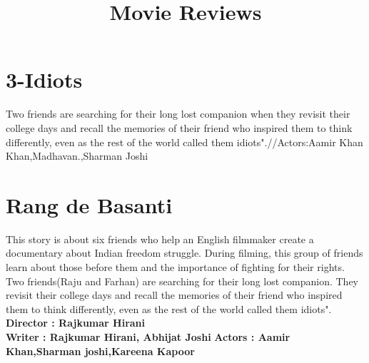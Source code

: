 \documentclass{article}
\title{Movie Reviews}
\begin{document}
	\maketitle
	\section{3-Idiots}
	\large{Two friends are searching for their long lost companion when they revisit their college days and recall the memories of their friend who inspired them to think differently, even as the rest of the world called them idiots".//Actors:Aamir Khan Khan,Madhavan.,Sharman Joshi}
	\section{Rang de Basanti}
	\large{This story is about six friends who help an English filmmaker create a documentary about Indian freedom struggle. During filming, this group of friends learn about those before them and the importance of fighting for their rights.}
	\large{Two friends(Raju and Farhan) are searching for their long lost companion. They revisit their college days and recall the memories of their friend who inspired them to think differently, even as the rest of the world called them idiots".}
\\
\textbf{Director : Rajkumar Hirani}
\\
\textbf{Writer : Rajkumar Hirani, Abhijat Joshi} %
\textbf{Actors : Aamir Khan,Sharman joshi,Kareena Kapoor}
\end{document}
